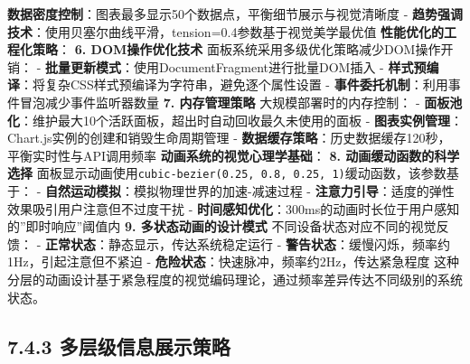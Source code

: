 {{{{{\textbf{数据密度控制}：图表最多显示50个数据点，平衡细节展示与视觉清晰度 - \textbf{趋势强调技术}：使用贝塞尔曲线平滑，tension=0.4参数基于视觉美学最优值 \textbf{性能优化的工程化策略}：
\textbf{6. DOM操作优化技术} 面板系统采用多级优化策略减少DOM操作开销： - \textbf{批量更新模式}：使用DocumentFragment进行批量DOM插入 -
\textbf{样式预编译}：将复杂CSS样式预编译为字符串，避免逐个属性设置 - \textbf{事件委托机制}：利用事件冒泡减少事件监听器数量 \textbf{7. 内存管理策略} 大规模部署时的内存控制： -
\textbf{面板池化}：维护最大10个活跃面板，超出时自动回收最久未使用的面板 - \textbf{图表实例管理}：Chart.js实例的创建和销毁生命周期管理 -
\textbf{数据缓存策略}：历史数据缓存120秒，平衡实时性与API调用频率 \textbf{动画系统的视觉心理学基础}： \textbf{8. 动画缓动函数的科学选择}
面板显示动画使用\texttt{cubic-bezier(0.25, 0.8, 0.25, 1)}缓动函数，该参数基于： - \textbf{自然运动模拟}：模拟物理世界的加速-减速过程 -
\textbf{注意力引导}：适度的弹性效果吸引用户注意但不过度干扰 - \textbf{时间感知优化}：300ms的动画时长位于用户感知的''即时响应''阈值内 \textbf{9. 多状态动画的设计模式}
不同设备状态对应不同的视觉反馈： - \textbf{正常状态}：静态显示，传达系统稳定运行 - \textbf{警告状态}：缓慢闪烁，频率约1Hz，引起注意但不紧迫 - \textbf{危险状态}：快速脉冲，频率约2Hz，传达紧急程度
这种分层的动画设计基于紧急程度的视觉编码理论，通过频率差异传达不同级别的系统状态。 \subsection{7.4.3
多层级信息展示策略}\label{ux591aux5c42ux7ea7ux4fe1ux606fux5c55ux793aux7b56ux7565}
}}}}}
